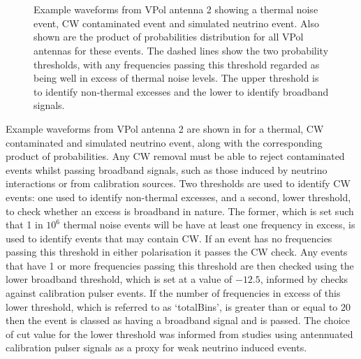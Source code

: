 \begin{figure}[htpb]
  \hfill
  \\
  \hfill
  \\
  \hfill
  \caption{Example waveforms from VPol antenna 2 showing a thermal noise event, CW contaminated event and simulated neutrino event. Also shown are the product of probabilities distribution for all VPol antennas for these events. The dashed lines show the two probability thresholds, with any frequencies passing this threshold regarded as being well in excess of thermal noise levels. The upper threshold is to identify non-thermal excesses and the lower to identify broadband signals.}
  \label{fig:analysis:CWRemoval:Baselines:Waveforms}
\end{figure}


Example waveforms from VPol antenna 2 are shown in  for a thermal, CW contaminated  and simulated neutrino event, along with the corresponding product of probabilities. Any CW removal must be able to reject contaminated events whilst passing broadband signals, such as those induced by neutrino interactions or from calibration sources. Two thresholds are used to identify CW events: one used to identify non-thermal excesses, and a second, lower threshold, to check whether an excess is broadband in nature. The former, which is set such that 1 in $10^{6}$ thermal noise events will be have at least one frequency in excess, is used to identify events that may contain CW. If an event has no frequencies passing this threshold in either polarisation it passes the CW check. Any events that have 1 or more frequencies passing this threshold are then checked using the lower broadband threshold, which is set at a value of $-12.5$, informed by checks against calibration pulser events. If the number of frequencies in excess of this lower threshold, which is referred to as `totalBins', is greater than or equal to 20 then the event is classed as having a broadband signal and is passed. The choice of cut value for the lower threshold was informed from studies using antennuated calibration pulser signals as a proxy for weak neutrino induced events.




